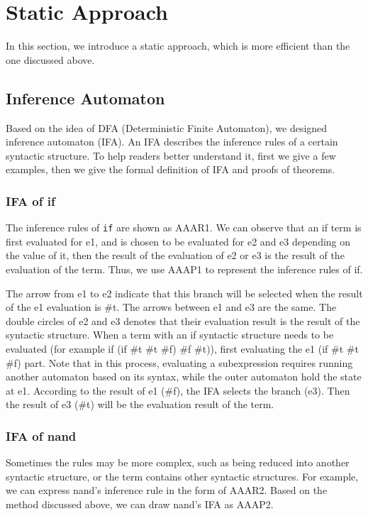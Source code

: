\section{Static Approach}
\label{sec:ruleDerivation}

In this section, we introduce a static approach, which is more efficient than the one discussed above.


\subsection{Inference Automaton}

Based on the idea of DFA (Deterministic Finite Automaton), we designed inference automaton (IFA). An IFA describes the inference rules of a certain syntactic structure. To help readers better understand it, first we give a few examples, then we give the formal definition of IFA and proofs of theorems.

\subsubsection{IFA of if}

The inference rules of \texttt{if} are shown as AAAR1. We can observe that an if term is first evaluated for e1, and is chosen to be evaluated for e2 and e3 depending on the value of it, then the result of the evaluation of e2 or e3 is the result of the evaluation of the term. Thus, we use AAAP1 to represent the inference rules of if.

The arrow from e1 to e2 indicate that this branch will be selected when the result of the e1 evaluation is \#t. The arrows between e1 and e3 are the same. The double circles of e2 and e3 denotes that their evaluation result is the result of the syntactic structure. When a term with an if syntactic structure needs to be evaluated (for example if (if \#t \#t \#f) \#f \#t)), first evaluating the e1 (if \#t \#t \#f) part. Note that in this process, evaluating a subexpression requires running another automaton based on its syntax, while the outer automaton hold the state at e1. According to the result of e1 (\#f), the IFA selects the branch (e3). Then the result of e3 (\#t) will be the evaluation result of the term.

\subsubsection{IFA of nand}

Sometimes the rules may be more complex, such as being reduced into another syntactic structure, or the term contains other syntactic structures. For example, we can express nand's inference rule in the form of AAAR2. Based on the method discussed above, we can draw nand's IFA as AAAP2.

